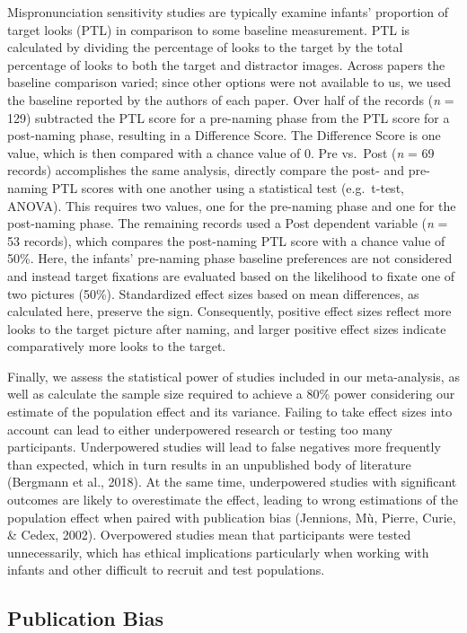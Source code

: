 \documentclass[
  man, noextraspace]{apa6}
\begin{document}
Mispronunciation sensitivity studies are typically examine infants' proportion of target looks (PTL) in comparison to some baseline measurement. PTL is calculated by dividing the percentage of looks to the target by the total percentage of looks to both the target and distractor images. Across papers the baseline comparison varied; since other options were not available to us, we used the baseline reported by the authors of each paper. Over half of the records (\emph{n} = 129) subtracted the PTL score for a pre-naming phase from the PTL score for a post-naming phase, resulting in a Difference Score. The Difference Score is one value, which is then compared with a chance value of 0. Pre vs.~Post (\emph{n} = 69 records) accomplishes the same analysis, directly compare the post- and pre-naming PTL scores with one another using a statistical test (e.g.~t-test, ANOVA). This requires two values, one for the pre-naming phase and one for the post-naming phase. The remaining records used a Post dependent variable (\emph{n} = 53 records), which compares the post-naming PTL score with a chance value of 50\%. Here, the infants' pre-naming phase baseline preferences are not considered and instead target fixations are evaluated based on the likelihood to fixate one of two pictures (50\%). Standardized effect sizes based on mean differences, as calculated here, preserve the sign. Consequently, positive effect sizes reflect more looks to the target picture after naming, and larger positive effect sizes indicate comparatively more looks to the target.

Finally, we assess the statistical power of studies included in our meta-analysis, as well as calculate the sample size required to achieve a 80\% power considering our estimate of the population effect and its variance. Failing to take effect sizes into account can lead to either underpowered research or testing too many participants. Underpowered studies will lead to false negatives more frequently than expected, which in turn results in an unpublished body of literature (Bergmann et al., 2018). At the same time, underpowered studies with significant outcomes are likely to overestimate the effect, leading to wrong estimations of the population effect when paired with publication bias (Jennions, Mù, Pierre, Curie, \& Cedex, 2002). Overpowered studies mean that participants were tested unnecessarily, which has ethical implications particularly when working with infants and other difficult to recruit and test populations.

\hypertarget{publication-bias}{%
\subsection{Publication Bias}\label{publication-bias}}
\end{document}
